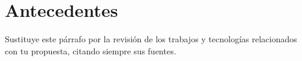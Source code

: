 \chapter{Antecedentes}\label{cap:antecedentes}

Sustituye este párrafo por la revisión de los trabajos y tecnologías
relacionados con tu propuesta, citando siempre sus fuentes.
